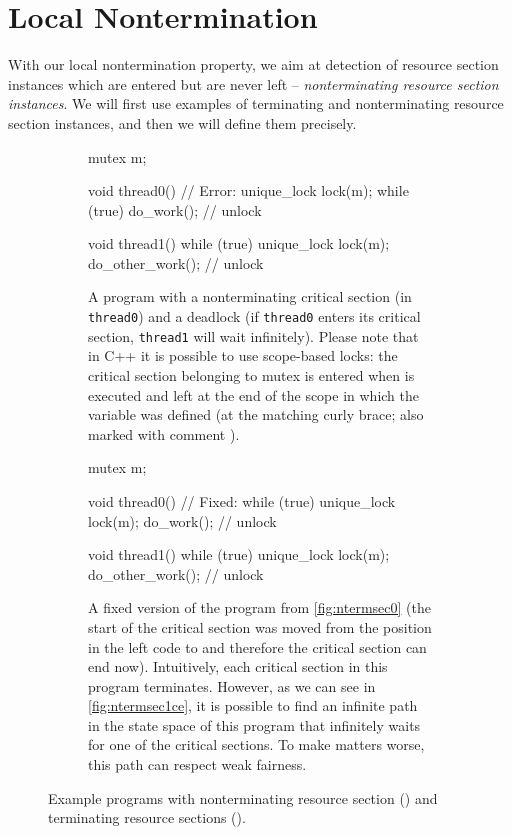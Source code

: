 \section{Local Nontermination} \label{sec:local-nontermination}

With our local nontermination property, we aim at detection of resource section instances which are entered but are never left -- \emph{nonterminating resource section instances}.
We will first use examples of terminating and nonterminating resource section instances, and then we will define them precisely.

\begin{figure}[tp]
\begin{subfigure}[t]{0.475\textwidth}
\begin{cppcode}
    mutex m;

    void thread0() {
      // Error:
      unique_lock lock(m);
      while (true) {
        do_work();
      }
    } // unlock

    void thread1() {
      while (true) {
        unique_lock lock(m);
        do_other_work();
      } // unlock
    }
\end{cppcode}
\caption{
    A program with a nonterminating critical section (in \texttt{thread0}) and a deadlock (if \texttt{thread0} enters its critical section, \texttt{thread1} will wait infinitely).
    Please note that in C++ it is possible to use scope-based locks: the critical section belonging to mutex  is entered when  is executed and left at the end of the scope in which the  variable was defined (at the matching curly brace; also marked with comment ).
}\label{fig:ntermsec0}
\end{subfigure}
%
\hfill
%
\begin{subfigure}[t]{0.475\textwidth}
\begin{cppcode}
    mutex m;

    void thread0() {
      // Fixed:
      while (true) {
        unique_lock lock(m);
        do_work();
      } // unlock
    }

    void thread1() {
      while (true) {
        unique_lock lock(m);
        do_other_work();
      } // unlock
    }
\end{cppcode}
\caption{
    A fixed version of the program from \autoref{fig:ntermsec0} (the start of the critical section was moved from the position  in the left code to  and therefore the critical section can end now).
    Intuitively, each critical section in this program terminates.
    However, as we can see in \autoref{fig:ntermsec1ce}, it is possible to find an infinite path in the state space of this program that infinitely waits for one of the critical sections.
    To make matters worse, this path can respect weak fairness.
} \label{fig:ntermsec1}
\end{subfigure}
\caption{Example programs with nonterminating resource section () and terminating resource sections ().
}
\end{figure}
